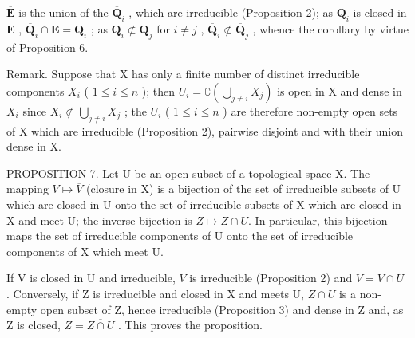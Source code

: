\(\overline{\mathbf{E}}\) is the union of the \(\overline{\mathbf{Q}}_i\) , which are irreducible (Proposition 2); as \(\mathbf{Q}_i\) is closed in \(\mathbf{E}\) , \(\overline{\mathbf{Q}}_i \cap \mathbf{E} = \mathbf{Q}_i\) ; as \(\mathbf{Q}_i \not\subset \mathbf{Q}_j\) for \(i \neq j\) , \(\overline{\mathbf{Q}}_i \not\subset \overline{\mathbf{Q}}_j\) , whence the corollary by virtue of Proposition 6.

Remark. Suppose that X has only a finite number of distinct irreducible components \(X_{i}\) ( \(1 \leqslant i \leqslant n\) ); then \(U_{i} = \complement\left(\bigcup_{j \neq i} X_{j}\right)\) is open in X and dense in \(X_{i}\) since \(X_{i} \not\subset \bigcup_{j \neq i} X_{j}\) ; the \(U_{i}\) ( \(1 \leqslant i \leqslant n\) ) are therefore non-empty open sets of X which are irreducible (Proposition 2), pairwise disjoint and with their union dense in X.

PROPOSITION 7. Let U be an open subset of a topological space X. The mapping \(V \mapsto \overline{V}\) (closure in X) is a bijection of the set of irreducible subsets of U which are closed in U onto the set of irreducible subsets of X which are closed in X and meet U; the inverse bijection is \(Z \mapsto Z \cap U\). In particular, this bijection maps the set of irreducible components of U onto the set of irreducible components of X which meet U.

If V is closed in U and irreducible, \(\overline{V}\) is irreducible (Proposition 2) and \(V = \overline{V} \cap U\) . Conversely, if Z is irreducible and closed in X and meets U, \(Z \cap U\) is a non-empty open subset of Z, hence irreducible (Proposition 3) and dense in Z and, as Z is closed, \(Z = \overline{Z \cap U}\) . This proves the proposition.

